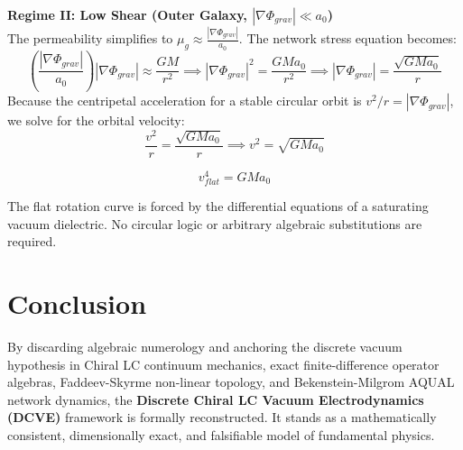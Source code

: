 \documentclass[11pt,a4paper]{article}
\begin{document}
\vspace{0.5em}
\textbf{Regime II: Low Shear (Outer Galaxy, $|\nabla \Phi_{grav}| \ll a_0$)} \\
The permeability simplifies to $\mu_g \approx \frac{|\nabla \Phi_{grav}|}{a_0}$. The network stress equation becomes:
\begin{equation}
    \left( \frac{|\nabla \Phi_{grav}|}{a_0} \right) |\nabla \Phi_{grav}| \approx \frac{GM}{r^2} \implies |\nabla \Phi_{grav}|^2 = \frac{G M a_0}{r^2} \implies |\nabla \Phi_{grav}| = \frac{\sqrt{G M a_0}}{r}
\end{equation}
Because the centripetal acceleration for a stable circular orbit is $v^2/r = |\nabla \Phi_{grav}|$, we solve for the orbital velocity:
\begin{equation}
    \frac{v^2}{r} = \frac{\sqrt{G M a_0}}{r} \implies v^2 = \sqrt{G M a_0} 
\end{equation}
\begin{tcolorbox}[colback=white, colframe=black, title=\textbf{The Baryonic Tully-Fisher Relation}]
\begin{equation}
    v_{flat}^4 = G M a_0
\end{equation}
\end{tcolorbox}
The flat rotation curve is forced by the differential equations of a saturating vacuum dielectric. No circular logic or arbitrary algebraic substitutions are required.

\section{Conclusion}
By discarding algebraic numerology and anchoring the discrete vacuum hypothesis in Chiral LC continuum mechanics, exact finite-difference operator algebras, Faddeev-Skyrme non-linear topology, and Bekenstein-Milgrom AQUAL network dynamics, the \textbf{Discrete Chiral LC Vacuum Electrodynamics (DCVE)} framework is formally reconstructed. It stands as a mathematically consistent, dimensionally exact, and falsifiable model of fundamental physics.
\end{document}
